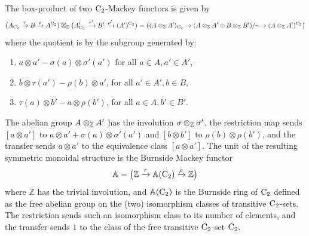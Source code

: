 \begin{definition}
\label{definition:box-mackey}%
The box-product of two $\mathrm{C_2}$-Mackey functors is given by
\[
\big(A_{\mathrm{C_2}}\xrightarrow{\tau}B\xrightarrow{\rho}A^{\mathrm{C_2}}\big)
\boxtimes_{\mathbb{Z}}
\big(A'_{\mathrm{C_2}}\xrightarrow{\tau'}B'\xrightarrow{\rho'}(A')^{\mathrm{C_2}}\big)
=\big((A\otimes_{\mathbb{Z}} A')_{\mathrm{C_2}}\xrightarrow{}(A\otimes_{\mathbb{Z}} A'\oplus B\otimes_{\mathbb{Z}} B')/\!\!\sim\to(A\otimes_{\mathbb{Z}} A')^{\mathrm{C_2}}\big)
\]
where the quotient is by the subgroup generated by:
\begin{enumerate}
\item $a\otimes a'-\sigma(a)\otimes \sigma'(a')$ for all $a\in A, a'\in A'$,
\item  $b\otimes \tau(a')-\rho(b)\otimes a'$, for all $a'\in A', b\in B$,
\item $\tau(a)\otimes b'-a\otimes \rho(b')$, for all $a\in A, b'\in B'$.
\end{enumerate}
The abelian group $A\otimes_{\mathbb{Z}} A'$ has the involution $\sigma\otimes_{\mathbb{Z}}\sigma'$,
the restriction map sends $[a\otimes a']$ to $a\otimes a'+\sigma(a)\otimes \sigma'(a')$ and $[b\otimes b']$ to $\rho(b)\otimes \rho(b')$, and the transfer sends $a\otimes a'$ to the equivalence class $[a\otimes a']$.
The unit of the resulting symmetric monoidal structure is the Burnside Mackey functor
\[
\mathbb{A}=\big(\mathbb{Z}\xrightarrow{\tau}\mathbb{A}(\mathrm{C_2})\xrightarrow{\rho}\mathbb{Z}\big)
\]
where $\mathbb{Z}$ has the trivial involution, and $\mathbb{A}(\mathrm{C_2})$ is the Burnside ring of $\mathrm{C_2}$ defined as the free abelian group on the (two) isomorphism classes of transitive $\mathrm{C_2}$-sets. The restriction sends such an isomorphism class to its number of elements, and the transfer sends $1$ to the class of the free transitive $\mathrm{C_2}$-set $\mathrm{C_2}$.
\end{definition}








